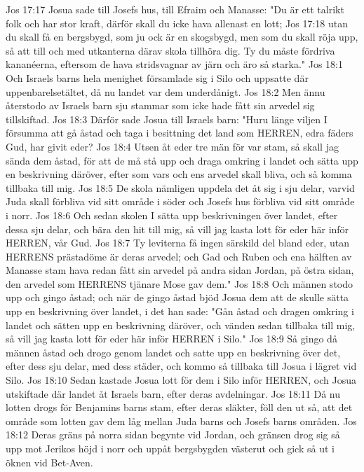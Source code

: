 Jos 17:17  Josua sade till Josefs hus, till Efraim och Manasse: "Du är ett talrikt folk och har stor kraft, därför skall du icke hava allenast en lott;
Jos 17:18  utan du skall få en bergsbygd, som ju ock är en skogsbygd, men som du skall röja upp, så att till och med utkanterna därav skola tillhöra dig. Ty du måste fördriva kananéerna, eftersom de hava stridsvagnar av järn och äro så starka."
Jos 18:1  Och Israels barns hela menighet församlade sig i Silo och uppsatte där uppenbarelsetältet, då nu landet var dem underdånigt.
Jos 18:2  Men ännu återstodo av Israels barn sju stammar som icke hade fått sin arvedel sig tillskiftad.
Jos 18:3  Därför sade Josua till Israels barn: "Huru länge viljen I försumma att gå åstad och taga i besittning det land som HERREN, edra fäders Gud, har givit eder?
Jos 18:4  Utsen åt eder tre män för var stam, så skall jag sända dem åstad, för att de må stå upp och draga omkring i landet och sätta upp en beskrivning däröver, efter som vars och ens arvedel skall bliva, och så komma tillbaka till mig.
Jos 18:5  De skola nämligen uppdela det åt sig i sju delar, varvid Juda skall förbliva vid sitt område i söder och Josefs hus förbliva vid sitt område i norr.
Jos 18:6  Och sedan skolen I sätta upp beskrivningen över landet, efter dessa sju delar, och bära den hit till mig, så vill jag kasta lott för eder här inför HERREN, vår Gud.
Jos 18:7  Ty leviterna få ingen särskild del bland eder, utan HERRENS prästadöme är deras arvedel; och Gad och Ruben och ena hälften av Manasse stam hava redan fått sin arvedel på andra sidan Jordan, på östra sidan, den arvedel som HERRENS tjänare Mose gav dem."
Jos 18:8  Och männen stodo upp och gingo åstad; och när de gingo åstad bjöd Josua dem att de skulle sätta upp en beskrivning över landet, i det han sade: "Gån åstad och dragen omkring i landet och sätten upp en beskrivning däröver, och vänden sedan tillbaka till mig, så vill jag kasta lott för eder här inför HERREN i Silo."
Jos 18:9  Så gingo då männen åstad och drogo genom landet och satte upp en beskrivning över det, efter dess sju delar, med dess städer, och kommo så tillbaka till Josua i lägret vid Silo.
Jos 18:10  Sedan kastade Josua lott för dem i Silo inför HERREN, och Josua utskiftade där landet åt Israels barn, efter deras avdelningar.
Jos 18:11  Då nu lotten drogs för Benjamins barns stam, efter deras släkter, föll den ut så, att det område som lotten gav dem låg mellan Juda barns och Josefs barns områden.
Jos 18:12  Deras gräns på norra sidan begynte vid Jordan, och gränsen drog sig så upp mot Jerikos höjd i norr och uppåt bergsbygden västerut och gick så ut i öknen vid Bet-Aven.
